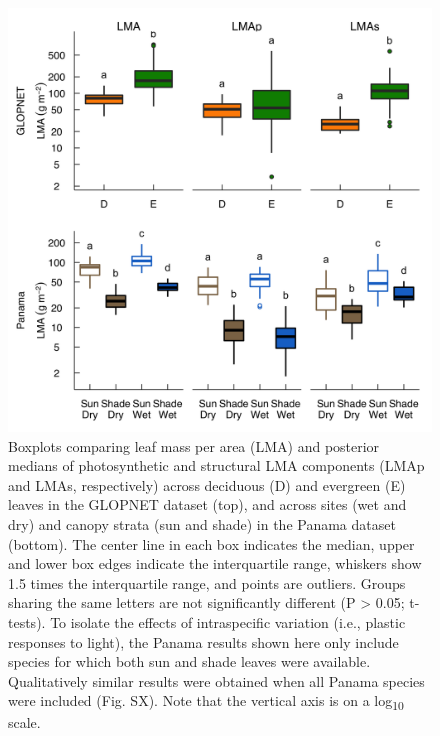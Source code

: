 \documentclass[
  12pt,
]{article}
\begin{document}
\begin{figure}
\hypertarget{fig:boxplt}{%
\centering
\includegraphics{../figs/box_main.png}
\caption{Boxplots comparing leaf mass per area (LMA) and posterior medians of photosynthetic and structural LMA components (LMAp and LMAs, respectively) across deciduous (D) and evergreen (E) leaves in the GLOPNET dataset (top), and across sites (wet and dry) and canopy strata (sun and shade) in the Panama dataset (bottom).
The center line in each box indicates the median, upper and lower box edges indicate the interquartile range, whiskers show 1.5 times the interquartile range, and points are outliers.
Groups sharing the same letters are not significantly different (P \textgreater{} 0.05; t-tests).
To isolate the effects of intraspecific variation (i.e., plastic responses to light), the Panama results shown here only include species for which both sun and shade leaves were available.
Qualitatively similar results were obtained when all Panama species were included (Fig. SX).
Note that the vertical axis is on a log\textsubscript{10} scale.}\label{fig:boxplt}
}
\end{figure}

\newpage
\end{document}
